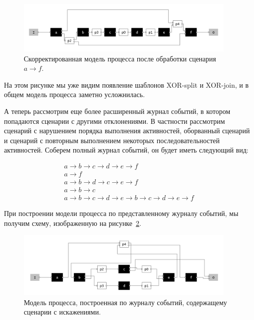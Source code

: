 \documentclass[
11pt,%
tightenlines,%
twoside,%
onecolumn,%
nofloats,%
nobibnotes,%
nofootinbib,%
superscriptaddress,%
noshowpacs,%
centertags]%
{revtex4}
\begin{document}
\begin{figure}[h]
\setcaptionmargin{5mm}
\includegraphics[width=0.95\textwidth]{pics/second1.png}
\caption{Скорректированная модель процесса после обработки сценария $a \rightarrow f$.}
\label{fig:second1}
\end{figure}

На этом рисунке мы уже видим появление шаблонов XOR-split и XOR-join, и в общем модель процесса заметно усложнилась.

А теперь рассмотрим еще более расширенный журнал событий, в котором попадаются сценарии с другими отклонениями.
В частности рассмотрим сценарий с нарушением порядка выполнения активностей, оборванный сценарий и сценарий с повторным выполнением некоторых последовательностей активностей.
Соберем полный журнал событий, он будет иметь следующий вид:

\begin{eqnarray*}
a \rightarrow b \rightarrow c \rightarrow d \rightarrow e \rightarrow f \\
a \rightarrow f \\
a \rightarrow b \rightarrow d \rightarrow c \rightarrow e \rightarrow f \\
a \rightarrow b \rightarrow c \\
a \rightarrow b \rightarrow c \rightarrow d \rightarrow e \rightarrow b \rightarrow c \rightarrow d \rightarrow e \rightarrow f
\end{eqnarray*}

При построении модели процесса по представленному журналу событий, мы получим схему, изображенную на рисунке~\ref{fig:third1}.

\begin{figure}[h]
\setcaptionmargin{5mm}
\includegraphics[width=0.95\textwidth]{pics/third1.png}
\caption{Модель процесса, построенная по журналу событий, содержащему сценарии с искажениями.}
\label{fig:third1}
\end{figure}
\end{document}
